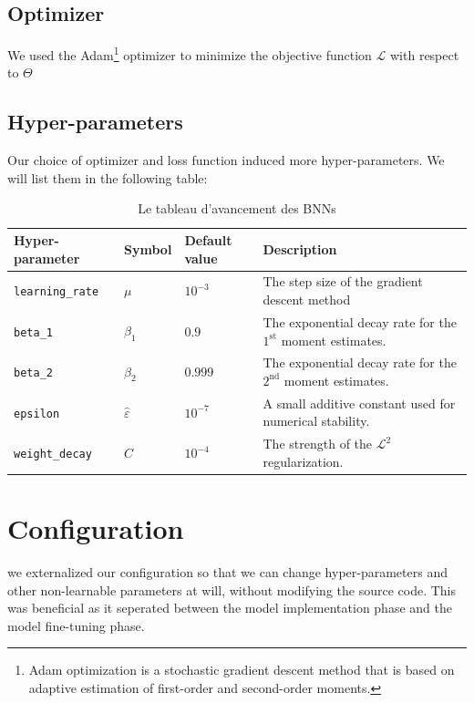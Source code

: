 \subsection{Optimizer}
We used the Adam\footnote{Adam optimization is a stochastic gradient descent method that is based on adaptive estimation of first-order and second-order moments.} optimizer \cite{AdamOptimizer} to minimize the objective function $\mathcal{L}$ with respect to $\Theta$

\subsection{Hyper-parameters}
Our choice of optimizer and loss function induced more hyper-parameters. We will list them in the following table:
\begin{table}[h]
	\begin{tabularx}{\textwidth}{| X | X | X | X |}
		\hline
		Hyper-parameter & Symbol & Default value &  Description \\ 
		\hline
		\texttt{learning\_rate} & $\mu$ & $10^{-3}$ & The step size of the gradient descent method \\ 
		\hline
		\texttt{beta\_1} & $\beta_1$ & $0.9$ & The exponential decay rate for the $1^\text{st}$ moment estimates. \\ 
		\hline
		\texttt{beta\_2} & $\beta_2$ & $0.999$ & The exponential decay rate for the $2^\text{nd}$ moment estimates. \\ 
		\hline
		\texttt{epsilon} & $\hat{\varepsilon}$ & $10^{-7}$ & A small additive constant used for numerical stability. \\
		\hline
		\texttt{weight\_decay} & $C$ & $10^{-4}$ & The strength of the $\mathscr{L}^2$ regularization. \\
		\hline
	\end{tabularx}
	\caption{Le tableau d'avancement des BNNs
		\label{table:OptimizerHyperparameters}}
\end{table}

\section{Configuration}
\label{section:ModelDesign:Configuration}
we externalized our configuration so that we can change hyper-parameters and other non-learnable parameters at will, without modifying the source code. This was beneficial as it seperated between the model implementation phase and the model fine-tuning phase.

